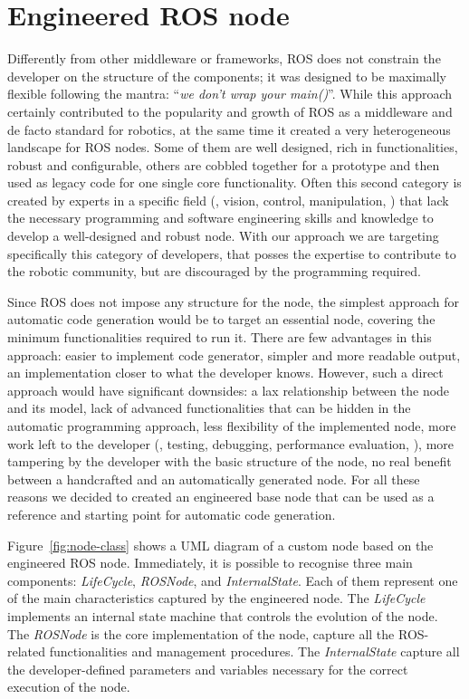 \section{Engineered ROS node}
\label{sec:ros-node}
Differently from other middleware or frameworks, ROS does not constrain the developer on the structure of the components; it was designed to be maximally flexible following the mantra: ``\textit{we don't wrap your main()}''. While this approach certainly contributed to the popularity and growth of ROS as a middleware and de facto standard for robotics, at the same time it created a very heterogeneous landscape for ROS nodes. Some of them are well designed, rich in functionalities, robust and configurable, others are cobbled together for a prototype and then used as legacy code for one single core functionality. Often this second category is created by experts in a specific field (\eg, vision, control, manipulation, \etc) that lack the necessary programming and software engineering skills and knowledge to develop a well-designed and robust node. With our approach we are targeting specifically this category of developers, that posses the expertise to contribute to the robotic community, but are discouraged by the programming required.

Since ROS does not impose any structure for the node, the simplest approach for automatic code generation would be to target an essential node, covering the minimum functionalities required to run it. There are few advantages in this approach: easier to implement code generator, simpler and more readable output, an implementation closer to what the developer knows. However, such a direct approach would have significant downsides: a lax relationship between the node and its model, lack of advanced functionalities that can be hidden in the automatic programming approach, less flexibility of the implemented node, more work left to the developer (\eg, testing, debugging, performance evaluation, \etc), more tampering by the developer with the basic structure of the node, no real benefit between a handcrafted and an automatically generated node. For all these reasons we decided to created an engineered base node that can be used as a reference and starting point for automatic code generation.

Figure~\ref{fig:node-class} shows a UML diagram of a custom node based on the engineered ROS node. Immediately, it is possible to recognise three main components: \textit{LifeCycle}, \textit{ROSNode}, and \textit{InternalState}. Each of them represent one of the main characteristics captured by the engineered node. The \textit{LifeCycle} implements an internal state machine that controls the evolution of the node. The \textit{ROSNode} is the core implementation of the node, capture all the ROS-related functionalities and management procedures. The \textit{InternalState} capture all the developer-defined parameters and variables necessary for the correct execution of the node.

